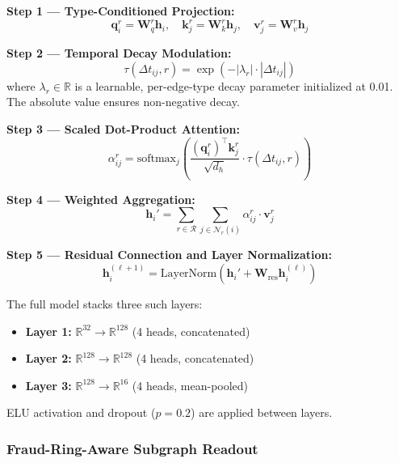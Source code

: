 \documentclass[journal]{IEEEtran}
\begin{document}
\textbf{Step 1 --- Type-Conditioned Projection:}
\begin{equation}
\mathbf{q}_i^r = \mathbf{W}_q^r \mathbf{h}_i, \quad \mathbf{k}_j^r = \mathbf{W}_k^r \mathbf{h}_j, \quad \mathbf{v}_j^r = \mathbf{W}_v^r \mathbf{h}_j
\end{equation}

\textbf{Step 2 --- Temporal Decay Modulation:}
\begin{equation}
\tau(\Delta t_{ij}, r) = \exp(-|\lambda_r| \cdot |\Delta t_{ij}|)
\end{equation}
where $\lambda_r \in \mathbb{R}$ is a learnable, per-edge-type decay parameter initialized at 0.01. The absolute value ensures non-negative decay. 

\textbf{Step 3 --- Scaled Dot-Product Attention:}
\begin{equation}
\alpha_{ij}^r = \text{softmax}_j \left( \frac{(\mathbf{q}_i^r)^\top \mathbf{k}_j^r}{\sqrt{d_h}} \cdot \tau(\Delta t_{ij}, r) \right)
\end{equation}

\textbf{Step 4 --- Weighted Aggregation:}
\begin{equation}
\mathbf{h}_i' = \sum_{r \in \mathcal{R}} \sum_{j \in \mathcal{N}_r(i)} \alpha_{ij}^r \cdot \mathbf{v}_j^r
\end{equation}

\textbf{Step 5 --- Residual Connection and Layer Normalization:}
\begin{equation}
\mathbf{h}_i^{(\ell+1)} = \text{LayerNorm}\left(\mathbf{h}_i' + \mathbf{W}_{\text{res}} \mathbf{h}_i^{(\ell)}\right)
\end{equation}

The full model stacks three such layers:
\begin{itemize}
    \item \textbf{Layer 1:} $\mathbb{R}^{32} \to \mathbb{R}^{128}$ (4 heads, concatenated)
    \item \textbf{Layer 2:} $\mathbb{R}^{128} \to \mathbb{R}^{128}$ (4 heads, concatenated)
    \item \textbf{Layer 3:} $\mathbb{R}^{128} \to \mathbb{R}^{16}$ (4 heads, mean-pooled)
\end{itemize}
ELU activation and dropout ($p=0.2$) are applied between layers. 

\subsubsection{Fraud-Ring-Aware Subgraph Readout}
\end{document}
